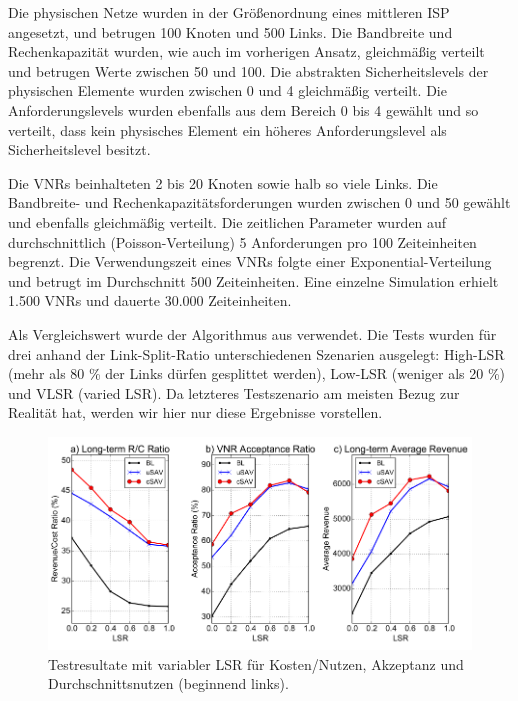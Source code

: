 \documentclass{lni}
\begin{document}
Die physischen Netze wurden in der Größenordnung eines mittleren ISP angesetzt, und betrugen 100 Knoten und 500 Links. Die Bandbreite und Rechenkapazität wurden, wie auch im vorherigen Ansatz, gleichmäßig verteilt und betrugen Werte zwischen 50 und 100. Die abstrakten Sicherheitslevels der physischen Elemente wurden zwischen 0 und 4 gleichmäßig verteilt. Die Anforderungslevels wurden ebenfalls aus dem Bereich 0 bis 4 gewählt und so verteilt, dass kein physisches Element ein höheres Anforderungslevel als Sicherheitslevel besitzt.

Die VNRs beinhalteten 2 bis 20 Knoten sowie halb so viele Links. Die Bandbreite- und Rechenkapazitätsforderungen wurden zwischen 0 und 50 gewählt und ebenfalls gleichmäßig verteilt.
Die zeitlichen Parameter wurden auf durchschnittlich (Poisson-Verteilung) 5 Anforderungen pro 100 Zeiteinheiten begrenzt. Die Verwendungszeit eines VNRs folgte einer Exponential-Verteilung und betrugt im Durchschnitt 500 Zeiteinheiten. Eine einzelne Simulation erhielt 1.500 VNRs und dauerte 30.000 Zeiteinheiten. 

Als Vergleichswert wurde der Algorithmus aus \cite{comp} verwendet. Die Tests wurden für drei anhand der Link-Split-Ratio unterschiedenen Szenarien ausgelegt: 
High-LSR (mehr als 80 \% der Links dürfen gesplittet werden),
Low-LSR (weniger als 20 \%) und VLSR (varied LSR). Da letzteres Testszenario am meisten Bezug zur Realität hat, werden wir hier nur diese Ergebnisse vorstellen. 

\begin{figure}[htb]
\begin{center}
	\includegraphics[width=1\textwidth]{perf_algo2.pdf}\newline
	\caption{\label{graph12} Testresultate mit variabler LSR für Kosten/Nutzen, Akzeptanz und Durchschnittsnutzen (beginnend links). \cite{algo2}}
\end{center}
\end{figure}
\end{document}
